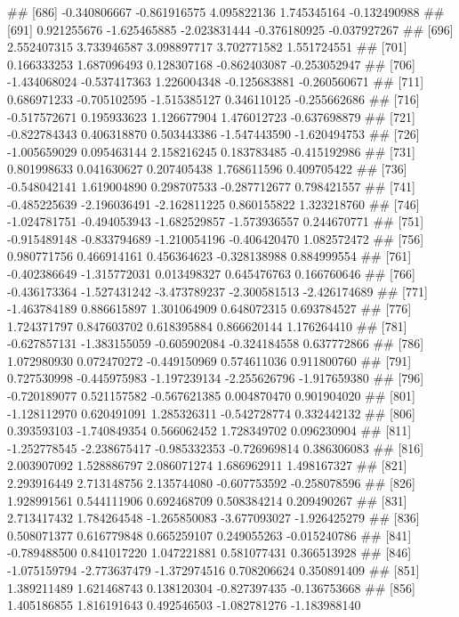 \documentclass[
]{article}
\begin{document}
\begin{enumerate}[label=(\alph*)]
##  [686] -0.340806667 -0.861916575  4.095822136  1.745345164 -0.132490988
##  [691]  0.921255676 -1.625465885 -2.023831444 -0.376180925 -0.037927267
##  [696]  2.552407315  3.733946587  3.098897717  3.702771582  1.551724551
##  [701]  0.166333253  1.687096493  0.128307168 -0.862403087 -0.253052947
##  [706] -1.434068024 -0.537417363  1.226004348 -0.125683881 -0.260560671
##  [711]  0.686971233 -0.705102595 -1.515385127  0.346110125 -0.255662686
##  [716] -0.517572671  0.195933623  1.126677904  1.476012723 -0.637698879
##  [721] -0.822784343  0.406318870  0.503443386 -1.547443590 -1.620494753
##  [726] -1.005659029  0.095463144  2.158216245  0.183783485 -0.415192986
##  [731]  0.801998633  0.041630627  0.207405438  1.768611596  0.409705422
##  [736] -0.548042141  1.619004890  0.298707533 -0.287712677  0.798421557
##  [741] -0.485225639 -2.196036491 -2.162811225  0.860155822  1.323218760
##  [746] -1.024781751 -0.494053943 -1.682529857 -1.573936557  0.244670771
##  [751] -0.915489148 -0.833794689 -1.210054196 -0.406420470  1.082572472
##  [756]  0.980771756  0.466914161  0.456364623 -0.328138988  0.884999554
##  [761] -0.402386649 -1.315772031  0.013498327  0.645476763  0.166760646
##  [766] -0.436173364 -1.527431242 -3.473789237 -2.300581513 -2.426174689
##  [771] -1.463784189  0.886615897  1.301064909  0.648072315  0.693784527
##  [776]  1.724371797  0.847603702  0.618395884  0.866620144  1.176264410
##  [781] -0.627857131 -1.383155059 -0.605902084 -0.324184558  0.637772866
##  [786]  1.072980930  0.072470272 -0.449150969  0.574611036  0.911800760
##  [791]  0.727530998 -0.445975983 -1.197239134 -2.255626796 -1.917659380
##  [796] -0.720189077  0.521157582 -0.567621385  0.004870470  0.901904020
##  [801] -1.128112970  0.620491091  1.285326311 -0.542728774  0.332442132
##  [806]  0.393593103 -1.740849354  0.566062452  1.728349702  0.096230904
##  [811] -1.252778545 -2.238675417 -0.985332353 -0.726969814  0.386306083
##  [816]  2.003907092  1.528886797  2.086071274  1.686962911  1.498167327
##  [821]  2.293916449  2.713148756  2.135744080 -0.607753592 -0.258078596
##  [826]  1.928991561  0.544111906  0.692468709  0.508384214  0.209490267
##  [831]  2.713417432  1.784264548 -1.265850083 -3.677093027 -1.926425279
##  [836]  0.508071377  0.616779848  0.665259107  0.249055263 -0.015240786
##  [841] -0.789488500  0.841017220  1.047221881  0.581077431  0.366513928
##  [846] -1.075159794 -2.773637479 -1.372974516  0.708206624  0.350891409
##  [851]  1.389211489  1.621468743  0.138120304 -0.827397435 -0.136753668
##  [856]  1.405186855  1.816191643  0.492546503 -1.082781276 -1.183988140

\end{enumerate}
\end{document}
